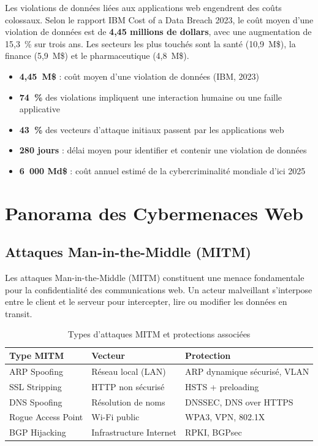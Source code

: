 \documentclass[12pt,a4paper]{report}
\newcommand{\hdr}[1]{\cellcolor{gray!15}\textbf{#1}}
\newcommand{\rowB}{\rowcolor{white}}
\begin{document}
Les violations de données liées aux applications web engendrent des coûts colossaux. Selon le
rapport IBM Cost of a Data Breach 2023, le coût moyen d'une violation de données est de
\textbf{4,45 millions de dollars}, avec une augmentation de 15,3~\% sur trois ans. Les secteurs
les plus touchés sont la santé (10,9~M\$), la finance (5,9~M\$) et le pharmaceutique (4,8~M\$).

\begin{infobox}[title={Chiffres clés de la cybersécurité web en 2023}]
\begin{itemize}[nosep]
  \item \textbf{4,45~M\$} : coût moyen d'une violation de données (IBM, 2023)
  \item \textbf{74~\%} des violations impliquent une interaction humaine ou une faille applicative
  \item \textbf{43~\%} des vecteurs d'attaque initiaux passent par les applications web
  \item \textbf{280 jours} : délai moyen pour identifier et contenir une violation de données
  \item \textbf{6~000 Md\$} : coût annuel estimé de la cybercriminalité mondiale d'ici 2025
\end{itemize}
\end{infobox}

\section{Panorama des Cybermenaces Web}

\subsection{Attaques Man-in-the-Middle (MITM)}

Les attaques Man-in-the-Middle (MITM) constituent une menace fondamentale pour la confidentialité
des communications web. Un acteur malveillant s'interpose entre le client et le serveur pour
intercepter, lire ou modifier les données en transit.

\begin{table}[h!]
\centering
\caption{Types d'attaques MITM et protections associées}
\begin{tabular}{p{3.5cm}p{4cm}p{5cm}}
\toprule
\hdr{Type MITM} & \hdr{Vecteur} & \hdr{Protection} \\
\midrule
ARP Spoofing & Réseau local (LAN) & ARP dynamique sécurisé, VLAN \\
\rowB SSL Stripping & HTTP non sécurisé & HSTS + preloading \\
DNS Spoofing & Résolution de noms & DNSSEC, DNS over HTTPS \\
\rowB Rogue Access Point & Wi-Fi public & WPA3, VPN, 802.1X \\
BGP Hijacking & Infrastructure Internet & RPKI, BGPsec \\
\bottomrule
\end{tabular}
\end{table}
\end{document}
